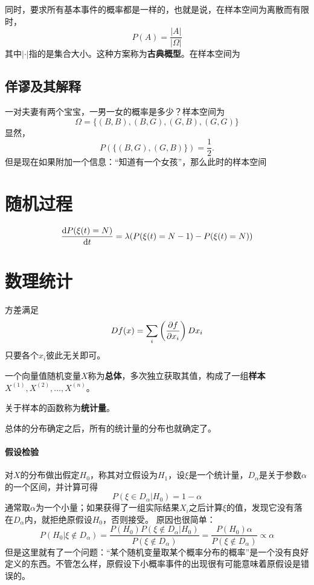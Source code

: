 \documentclass[UTF8, a4paper]{ctexart}
\begin{document}
同时，要求所有基本事件的概率都是一样的，也就是说，在样本空间为离散而有限时，
\[
    P(A) = \frac{|A|}{|\Omega|}
\]
其中$|\cdot|$指的是集合大小。这种方案称为\textbf{古典概型}。在样本空间为

\subsection{佯谬及其解释}

\newcommand*{\example}{\paragraph{例}} 一对夫妻有两个宝宝，一男一女的概率是多少？样本空间为
\[
    \Omega = \{ (B, B), (B, G), (G, B), (G, G) \}
\]
显然，
\[
    P(\{ (B, G), (G, B) \}) = \frac{1}{2}.
\]
但是现在如果附加一个信息：“知道有一个女孩”，那么此时的样本空间

\section{随机过程}

\begin{equation}
    \dv{P(\xi(t) = N)}{t} = \lambda (P(\xi(t)=N-1) - P(\xi(t) = N))
\end{equation}

\section{数理统计}

方差满足
\[
    D f(x) = \sum_i \left( \pdv{f}{x_i} \right) Dx_i
\]
只要各个$x_i$彼此无关即可。

一个向量值随机变量$X$称为\textbf{总体}，多次独立获取其值，构成了一组\textbf{样本}$X^{(1)}, X^{(2)}, \ldots, X^{(n)}$。

关于样本的函数称为\textbf{统计量}。

总体的分布确定之后，所有的统计量的分布也就确定了。

\paragraph{假设检验} 对$X$的分布做出假定$H_0$，称其对立假设为$H_1$，设$\xi$是一个统计量，$D_\alpha$是关于参数$\alpha$的一个区间，并计算可得
\[
    P(\xi \in D_\alpha | H_0 ) = 1 - \alpha
\]
通常取$\alpha$为一个小量；如果获得了一组实际结果$X_i$之后计算$\xi$的值，发现它没有落在$D_\alpha$内，就拒绝原假设$H_0$，否则接受。
原因也很简单：
\[
    P ( H_0 | \xi \notin D_\alpha ) = \frac{P(H_0) P(\xi \notin D_\alpha | H_0)}{P(\xi \notin D_\alpha)} 
    = \frac{P(H_0) \alpha}{P(\xi \notin D_\alpha)} \propto \alpha
\]
但是这里就有了一个问题：“某个随机变量取某个概率分布的概率”是一个没有良好定义的东西。不管怎么样，原假设下小概率事件的出现很有可能意味着原假设是错误的。
\end{document}
